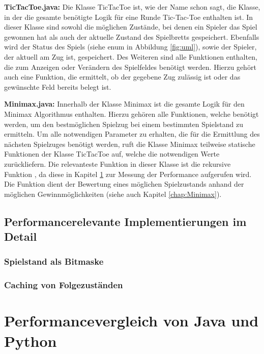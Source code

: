 \textbf{TicTacToe.java:} Die Klasse TicTacToe ist, wie der Name schon sagt, die Klasse, in der die gesamte benötigte Logik für eine Runde
Tic-Tac-Toe enthalten ist. In dieser Klasse sind sowohl die möglichen Zustände, bei denen ein Spieler das Spiel gewonnen hat als auch der
aktuelle Zustand des Spielbretts gespeichert. Ebenfalls wird der Status des Spiels (siehe enum in Abbildung \ref{fig:uml}), sowie der Spieler, der aktuell
am Zug ist, gespeichert. Des Weiteren sind alle Funktionen enthalten, die zum Anzeigen oder Verändern des Spielfeldes benötigt werden. Hierzu
gehört auch eine Funktion, die ermittelt, ob der gegebene Zug zulässig ist oder das gewünschte Feld bereits belegt ist.

\textbf{Minimax.java:} Innerhalb der Klasse Minimax ist die gesamte Logik für den Minimax Algorithmus enthalten. Hierzu gehören alle Funktionen,
welche benötigt werden, um den bestmöglichen Spielzug bei einem bestimmten Spielstand zu ermitteln. Um alle notwendigen Parameter zu erhalten,
die für die Ermittlung des nächsten Spielzuges benötigt werden, ruft die Klasse Minimax teilweise statische Funktionen der Klasse TicTacToe auf,
welche die notwendigen Werte zurückliefern. Die relevanteste Funktion in dieser Klasse ist die rekursive Funktion , 
da diese in Kapitel \ref{chap:performancevergleich} zur Messung der Performance aufgerufen wird. Die Funktion dient der Bewertung eines möglichen 
Spielzustands anhand der möglichen Gewinnmöglichkeiten (siehe auch Kapitel \ref{chap:Minimax}).

\subsection{Performancerelevante Implementierungen im Detail}

\subsubsection{Spielstand als Bitmaske}

\subsubsection{Caching von Folgezuständen}

\section{Performancevergleich von Java und Python}
\label{chap:performancevergleich}

